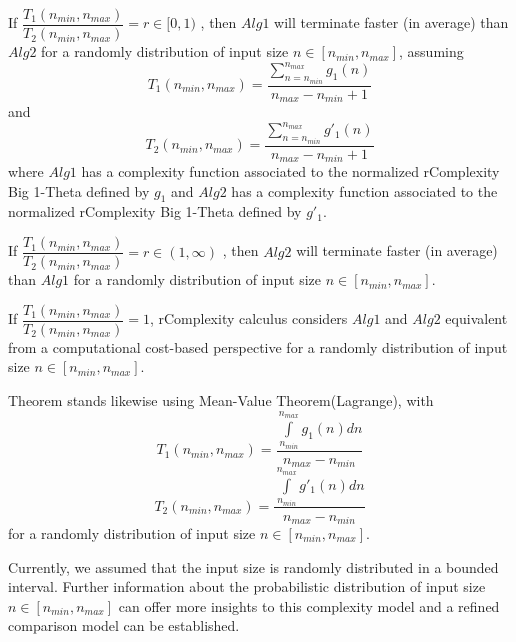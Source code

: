\begin{theorem}
If $ \dfrac{T_{1}(n_{min}, n_{max})}{T_{2}(n_{min}, n_{max})} = r \in [0,1) $ , then $Alg1$ will terminate faster (in average) than $Alg2$ for a randomly distribution of input size $n \in [n_{min}, n_{max}]$,  assuming \[T_{1}(n_{min}, n_{max}) = \dfrac{\sum\limits_{n=n_{min}}^{n_{max}} g_{1}(n)}{n_{max} - n_{min} + 1}\] and \[T_{2}(n_{min}, n_{max}) = \dfrac{\sum\limits_{n=n_{min}}^{n_{max}} g'_{1}(n)}{n_{max} - n_{min} + 1}\] where $Alg1$ has a complexity function associated to the normalized rComplexity Big 1-Theta defined by $g_{1}$ and $Alg2$ has a complexity function associated to the normalized rComplexity Big 1-Theta defined by $g'_{1}$.
\end{theorem}

\begin{corollary}
If $ \dfrac{T_{1}(n_{min}, n_{max})}{T_{2}(n_{min}, n_{max})} = r \in (1,\infty) $ , then $Alg2$ will terminate faster (in average) than $Alg1$ for a randomly distribution of input size $n \in [n_{min}, n_{max}]$.
\end{corollary}

\begin{remark}
If  $ \dfrac{T_{1}(n_{min}, n_{max})}{T_{2}(n_{min}, n_{max})} = 1$, rComplexity calculus considers $Alg1$ and $Alg2$ equivalent from a computational cost-based perspective for a randomly distribution of input size $n \in [n_{min}, n_{max}]$.
\end{remark}

\begin{remark}
Theorem stands likewise using Mean-Value Theorem(Lagrange), with 
\[  T_{1}(n_{min}, n_{max}) = \dfrac{\int\limits_{n_{min}}^{n_{max}} g_{1}(n) dn}{n_{max} - n_{min}}  \]
\[  T_{2}(n_{min}, n_{max}) = \dfrac{\int\limits_{n_{min}}^{n_{max}} g'_{1}(n) dn}{n_{max} - n_{min}}  \]
for a randomly distribution of input size $n \in [n_{min}, n_{max}]$.
\end{remark}

Currently, we assumed that the input size is randomly distributed in a bounded interval. Further information about the probabilistic distribution of input size $n \in [n_{min}, n_{max}]$ can offer more insights to this complexity model and a refined comparison model can be established.

